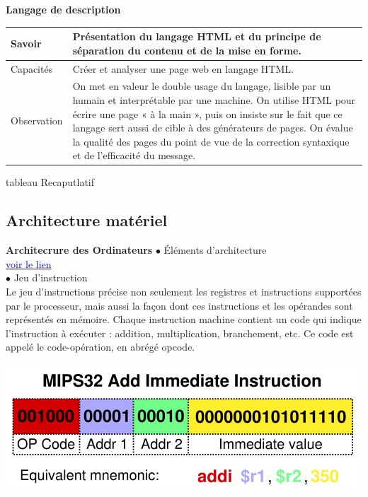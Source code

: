 \documentclass[a4paper, 12pt]{beamer}
\begin{document}
	\begin{frame}
		\begin{block}{\textbf{Langage de description}}
			\begin{center}
 \end{center}         
\begin{table}[!h]
\begin{tabular}{|l||p{9cm}|} \hline
Savoir & Présentation du langage HTML et du principe de séparation du contenu et de la mise en forme.\\ \hline \hline
Capacités & Créer et analyser une page web en langage HTML.\\ \hline \hline
Observation & On met en valeur le double usage du langage, lisible par un humain et interprétable par une machine. On utilise HTML pour écrire une page « à la main », puis on insiste sur le fait que ce langage sert aussi de cible à des générateurs de pages. On évalue la qualité des pages du point de vue de la correction syntaxique et de l'efficacité du message.\\ \hline
\end{tabular}
\end{table}
		\end{block}{tableau Recaputlatif}
\end{frame}
	
\subsection{Architecture matériel}
	\begin{frame}
		\begin{block}{\textbf{Architecrure des Ordinateurs}}
		$\bullet$  Éléments d’architecture\\
\href{http://web.isen-bretagne.fr/livres/python/ressources/WEB/00-Chapitres/Chap1-Architecture.pdf}{\textcolor{blue}{voir le lien}}\\
$\bullet$  Jeu d’instruction\\
Le jeu d'instructions précise non seulement les registres et instructions supportées par le processeur, mais aussi la façon dont ces instructions et les opérandes sont représentés en mémoire.
Chaque instruction machine contient un code qui indique l'instruction à exécuter : addition, multiplication, branchement, etc. Ce code est appelé le code-opération, en abrégé opcode. 
\begin{center}
\includegraphics[scale=0.3]{MIPS32_instruction.png}
\end{center}
		
		\end{block}
\end{frame}
\end{document}
